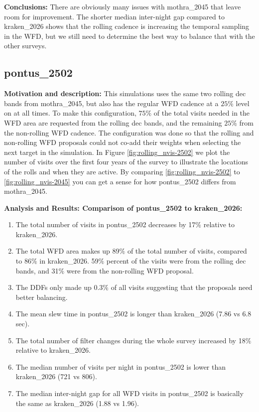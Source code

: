 \documentclass[DM,authoryear,toc]{lsstdoc}
\begin{document}
\textbf{Conclusions:} There are obviously many issues with mothra\_2045 that leave room for improvement. The shorter median inter-night
gap compared to kraken\_2026 shows that the rolling cadence is increasing the temporal sampling in the WFD, but we still need to determine
the best way to balance that with the other surveys.

\subsection{pontus\_2502} \label{pontus2502}

\textbf{Motivation and description:} This simulations uses the same two rolling dec bands from mothra\_2045, but also has the
regular WFD cadence at a $25\%$ level on at all times. To make this configuration, $75\%$ of the total visits needed in the WFD area are requested from the
rolling dec bands, and the remaining $25\%$ from the non-rolling WFD cadence. The configuration was done so that the rolling and non-rolling WFD
proposals could not co-add their weights when selecting the next target in the simulation. In Figure \autoref{fig:rolling_nvis-2502} we plot the number
of visits over the first four years of the survey to illustrate the locations of the rolls and when they are active. By comparing \autoref{fig:rolling_nvis-2502}
to \autoref{fig:rolling_nvis-2045} you can get a sense for how pontus\_2502 differs from mothra\_2045.

\textbf{Analysis and Results: Comparison of pontus\_2502 to kraken\_2026:}


\begin{enumerate}
\item The total number of visits in pontus\_2502 decreases by 17$\%$ relative to kraken\_2026.
\item The total WFD area makes up 89$\%$ of the total number of visits, compared to 86$\%$ in kraken\_2026.
59$\%$ percent of the visits were from the rolling dec bands, and 31$\%$ were from the non-rolling WFD proposal.
\item The DDFs only made up  0.3$\%$ of all visits suggesting that the proposals need better balancing.
\item The mean slew time in pontus\_2502 is longer than kraken\_2026 (7.86 vs 6.8 sec).
\item The total number of filter changes during the whole survey increased by 18$\%$ relative to kraken\_2026.
\item The median number of visits per night in pontus\_2502 is lower than kraken\_2026 (721 vs 806).
\item The median inter-night gap for all WFD visits in pontus\_2502 is basically the same as kraken\_2026  (1.88 vs 1.96).
\end{enumerate}
\end{document}
